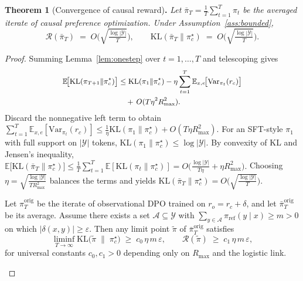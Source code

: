 
\noindent\textbf{Theorem 1} (Convergence of causal reward)\textbf{.} \textit{Let $\bar\pi_T=\tfrac1T\sum_{t=1}^T \pi_t$ be the averaged iterate of causal preference optimization.
Under Assumption~\ref{ass:bounded},}
\[
\mathcal{R}(\bar\pi_T)\;=\;O\!\Big(\sqrt{\tfrac{\log|\mathcal{Y}|}{T}}\Big),
\qquad
\mathrm{KL}(\bar\pi_T\|\pi_c^\star)\;=\;O\!\Big(\sqrt{\tfrac{\log|\mathcal{Y}|}{T}}\Big).
\]


\begin{proof}
Summing Lemma~\ref{lem:onestep} over $t=1,\dots,T$ and telescoping gives
\[
\small
\begin{aligned}
\mathbb{E}\!\big[
\mathrm{KL}(\pi_{T+1}\|\pi_c^\star)
\big]
&\le
\mathrm{KL}(\pi_1\|\pi_c^\star)
-\eta
\sum_{t=1}^{T}
\mathbb{E}_{x,e}\!\big[
\mathrm{Var}_{\pi_t}(r_c)
\big]  \\
&\quad
+\,O(T\eta^2R_{\max}^2).
\end{aligned}
\]
Discard the nonnegative left term to obtain
\(
\sum_{t=1}^T\mathbb{E}_{x,e}[\mathrm{Var}_{\pi_t}(r_c)]
\le \tfrac{1}{\eta}\mathrm{KL}(\pi_1\|\pi_c^\star)+O(T\eta R_{\max}^2).
\)
For an SFT-style $\pi_1$ with full support on $|\mathcal{Y}|$ tokens,
$\mathrm{KL}(\pi_1\|\pi_c^\star)\le \log|\mathcal{Y}|$.
By convexity of KL and Jensen’s inequality,
\(
\mathbb{E}\big[\mathrm{KL}(\bar\pi_T\|\pi_c^\star)\big]
\le \tfrac{1}{T}\sum_{t=1}^T \mathbb{E}[\mathrm{KL}(\pi_t\|\pi_c^\star)]
= O\!\Big(\tfrac{\log|\mathcal{Y}|}{T\eta}+\eta R_{\max}^2\Big).
\)
Choosing $\eta=\sqrt{\tfrac{\log|\mathcal{Y}|}{TR_{\max}^2}}$ balances the terms and yields
\(
\mathrm{KL}(\bar\pi_T\|\pi_c^\star)=O\!\big(\sqrt{\tfrac{\log|\mathcal{Y}|}{T}}\big).
\)

\begin{theorem}\label{thm:biasfloor}
Let $\pi_T^{\mathrm{orig}}$ be the iterate of observational DPO trained on $r_o=r_c+\delta$, and let $\bar\pi_T^{\mathrm{orig}}$ be its average.  
Assume there exists a set $\mathcal{A}\subseteq\mathcal{Y}$ with $\sum_{y\in\mathcal{A}}\pi_{\mathrm{ref}}(y\mid x)\ge m>0$
on which $|\delta(x,y)|\ge \varepsilon$.
Then any limit point $\tilde\pi$ of $\bar\pi_T^{\mathrm{orig}}$ satisfies
\[
\liminf_{T\to\infty}\mathrm{KL}\!\big(\tilde\pi\;\big\|\;\pi_c^\star\big)
\;\ge\; c_0\,\eta\,m\,\varepsilon,
\qquad
\mathcal{R}(\tilde\pi)
\;\ge\; c_1\,\eta\,m\,\varepsilon,
\]
for universal constants $c_0,c_1>0$ depending only on $R_{\max}$ and the logistic link.
\end{theorem}


\end{proof}
